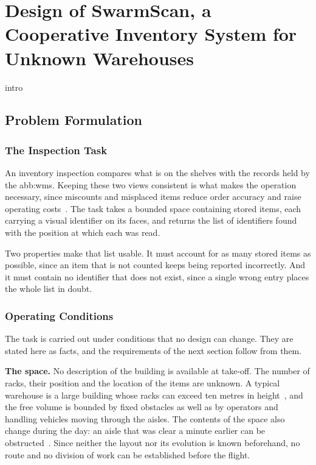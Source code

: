 \chapter[Conception of SwarmScan]{Design of SwarmScan, a Cooperative Inventory
    System for Unknown Warehouses}%
\label{chap:system}

{intro}


\section{Problem Formulation}%
\label{sec:sys:problem}
\subsection{The Inspection Task}%
\label{subsec:sys:task}

An inventory inspection compares what is on the shelves with the records held by
the \gls{abb:wms}. Keeping these two views consistent is what makes the operation
necessary, since miscounts and misplaced items reduce order accuracy and raise
operating costs~\cite{pore2026drone}. The task takes a bounded space containing
stored items, each carrying a visual identifier on its faces, and returns the
list of identifiers found with the position at which each was read.

Two properties make that list usable. It must account for as many stored items as
possible, since an item that is not counted keeps being reported incorrectly. And
it must contain no identifier that does not exist, since a single wrong entry
places the whole list in doubt.

\subsection{Operating Conditions}%
\label{subsec:sys:conditions}

The task is carried out under conditions that no design can change. They are
stated here as facts, and the requirements of the next section follow from them.

\textbf{The space.} No description of the building is available at take-off. The
number of racks, their position and the location of the items are unknown. A
typical warehouse is a large building whose racks can exceed ten metres in
height~\cite{kalinov2020warevision}, and the free volume is bounded by fixed
obstacles as well as by operators and handling vehicles moving through the
aisles. The contents of the space also change during the day: an aisle that was
clear a minute earlier can be obstructed~\cite{pore2026drone}. Since neither the
layout nor its evolution is known beforehand, no route and no division of work
can be established before the flight.

